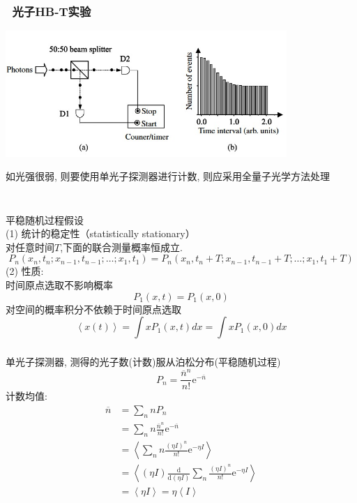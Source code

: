  \begin{frame} 
  \frametitle{ 光子HB-T实验}
         \begin{center}
              \includegraphics[width=0.8\textwidth]{figs/2022-05-08-16-13-39.png}
         \end{center}
     如光强很弱, 则要使用单光子探测器进行计数, 则应采用全量子光学方法处理
 \end{frame}

 \begin{frame} 
    \frametitle{}
    ~\\
    {\Bullet}平稳随机过程假设\\
    (1) 统计的稳定性（statistically stationary）\\ 
    对任意时间$T$,下面的联合测量概率恒成立.
         \[ P_{n}\left(x_{n}, t_{n} ; x_{n-1}, t_{n-1} ; \ldots ; x_{1}, t_{1}\right)=P_{n}\left(x_{n}, t_{n}+T ; x_{n-1}, t_{n-1}+T ; \ldots ; x_{1}, t_{1}+T\right)\]
    (2) 性质: \\ 
    时间原点选取不影响概率
    \[ P_1(x,t)=P_1(x,0)\]
    对空间的概率积分不依赖于时间原点选取
    \[ \left\langle x(t) \right\rangle = \int x P_1(x,t)dx=  \int x P_1(x,0)dx  \]
    \end{frame}

 \begin{frame} 
  \frametitle{}
  {\Bullet} 单光子探测器, 测得的光子数(计数)服从泊松分布(平稳随机过程)
       \[  P_n = \frac{\overline{n}^n }{n!} \mathrm{e}^{- \overline{n} }\]
       计数均值:
    \[ \begin{aligned}
        \overline{n} &= \sum_n n P_n\\
        &=\sum_n n \frac{\overline{n}^n }{n!} \mathrm{e}^{- \overline{n} } \\
        &= \left\langle \sum_n n \frac{(\eta I)^n }{n!} \mathrm{e}^{- \eta I }  \right\rangle \\ 
        &= \left\langle (\eta I) \frac{\mathrm{d}}{\mathrm{d}(\eta I)}\sum_n  \frac{(\eta I)^n }{n!} \mathrm{e}^{-\eta I }  \right\rangle \\
        &=  \left\langle \eta I \right\rangle = \eta \left\langle I \right\rangle
    \end{aligned}\] 
 \end{frame}

